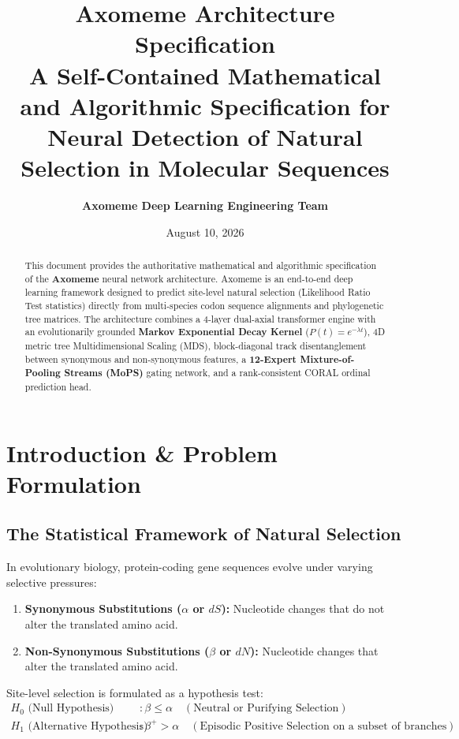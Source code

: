 \documentclass[11pt,a4paper]{article}
\title{\textbf{\Large Axomeme Architecture Specification}\\[0.5em]
\large A Self-Contained Mathematical and Algorithmic Specification for Neural Detection of Natural Selection in Molecular Sequences}
\author{\textbf{Axomeme Deep Learning Engineering Team}}
\date{August 10, 2026}
\begin{document}
\maketitle

\begin{abstract}
This document provides the authoritative mathematical and algorithmic specification of the \textbf{Axomeme} neural network architecture. Axomeme is an end-to-end deep learning framework designed to predict site-level natural selection (Likelihood Ratio Test statistics) directly from multi-species codon sequence alignments and phylogenetic tree matrices. The architecture combines a 4-layer dual-axial transformer engine with an evolutionarily grounded \textbf{Markov Exponential Decay Kernel} ($P(t) = e^{-\lambda t}$), 4D metric tree Multidimensional Scaling (MDS), block-diagonal track disentanglement between synonymous and non-synonymous features, a \textbf{12-Expert Mixture-of-Pooling Streams (MoPS)} gating network, and a rank-consistent CORAL ordinal prediction head.
\end{abstract}

\tableofcontents
\newpage

\section{Introduction \& Problem Formulation}

\subsection{The Statistical Framework of Natural Selection}
In evolutionary biology, protein-coding gene sequences evolve under varying selective pressures:
\begin{enumerate}
    \item \textbf{Synonymous Substitutions ($\alpha$ or $dS$):} Nucleotide changes that do not alter the translated amino acid.
    \item \textbf{Non-Synonymous Substitutions ($\beta$ or $dN$):} Nucleotide changes that alter the translated amino acid.
\end{enumerate}

Site-level selection is formulated as a hypothesis test:
\begin{align}
H_0 \text{ (Null Hypothesis)}&: \beta \le \alpha \quad (\text{Neutral or Purifying Selection}) \\
H_1 \text{ (Alternative Hypothesis)}&: \beta^+ > \alpha \quad (\text{Episodic Positive Selection on a subset of branches})
\end{align}
\end{document}
